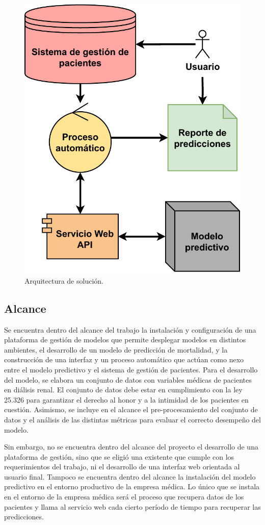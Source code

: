 \begin{figure}[htpb]
\centering 
\includegraphics[width=.50\textwidth]{./Figures/Arquiectura_Solucion_Basica.pdf}
\caption{Arquitectura de solución.}
\label{fig:diagArqBasic}
\end{figure}


\subsection{Alcance}

Se encuentra dentro del alcance del trabajo la instalación y configuración de una plataforma de gestión de modelos que permite desplegar modelos en distintos ambientes, el desarrollo de un modelo de predicción de mortalidad, y la construcción de una interfaz y un proceso automático que actúan como nexo entre el modelo predictivo y el sistema de gestión de pacientes.
Para el desarrollo del modelo, se elabora un conjunto de datos con variables médicas de pacientes en diálisis renal. El conjunto de datos debe estar en cumplimiento con la ley 25.326 para garantizar el derecho al honor y a la intimidad de los pacientes en cuestión. Asimismo, se incluye en el alcance el pre-procesamiento del conjunto de datos y el análisis de las distintas métricas para evaluar el correcto desempeño del modelo.

Sin embargo, no se encuentra dentro del alcance del proyecto el desarrollo de una plataforma de gestión, sino que se eligió una existente que cumple con los requerimientos del trabajo, ni el desarrollo de una interfaz web orientada al usuario final. Tampoco se encuentra dentro del alcance la instalación del modelo predictivo en el entorno productivo de la empresa médica. Lo único que se instala en el entorno de la empresa médica será el proceso que recupera datos de los pacientes y llama al servicio web cada cierto período de tiempo para recuperar las predicciones. 

